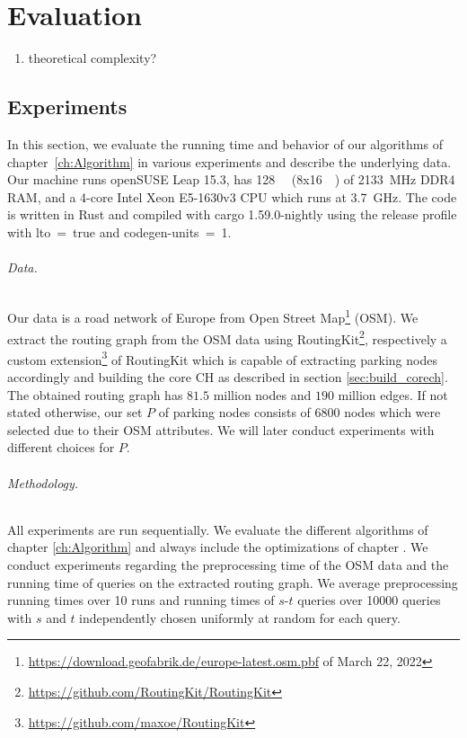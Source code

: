 
\chapter{Evaluation}
\label{ch:Evaluation}
\begin{enumerate}
	\item theoretical complexity?
\end{enumerate}

\section{Experiments}
In this section, we evaluate the running time and behavior of our algorithms of chapter~\ref{ch:Algorithm} in various experiments and describe the underlying data. Our machine runs openSUSE Leap 15.3, has \SI{128}{\giga\byte} (8x\SI{16}{\giga\byte}) of \SI{2133}{\mega\hertz} DDR4 RAM, and a 4-core Intel Xeon E5-1630v3 CPU which runs at \SI{3.7}{\giga\hertz}. The code is written in Rust and compiled with cargo 1.59.0-nightly using the release profile with lto~=~true and codegen-units~=~1.

\subparagraph{Data.} Our data is a road network of Europe from Open Street Map\footnote{\url{https://download.geofabrik.de/europe-latest.osm.pbf} of March 22, 2022} (OSM). We extract the routing graph from the OSM data using RoutingKit\footnote{\url{https://github.com/RoutingKit/RoutingKit}}, respectively a custom extension\footnote{\url{https://github.com/maxoe/RoutingKit}} of RoutingKit which is capable of extracting parking nodes accordingly and building the core CH as described in section \ref{sec:build_corech}. The obtained routing graph has $81.5$ million nodes and $190$ million edges. If not stated otherwise, our set $P$ of parking nodes consists of 6800 nodes which were selected due to their OSM attributes. We will later conduct experiments with different choices for $P$.

\subparagraph{Methodology.} All experiments are run sequentially. We evaluate the different algorithms of chapter \ref{ch:Algorithm} and always include the optimizations of chapter . We conduct experiments regarding the preprocessing time of the OSM data and the running time of queries on the extracted routing graph. We average preprocessing running times over 10 runs and running times of $s$-$t$ queries over \num{10000} queries with $s$ and $t$ independently chosen uniformly at random for each query.

